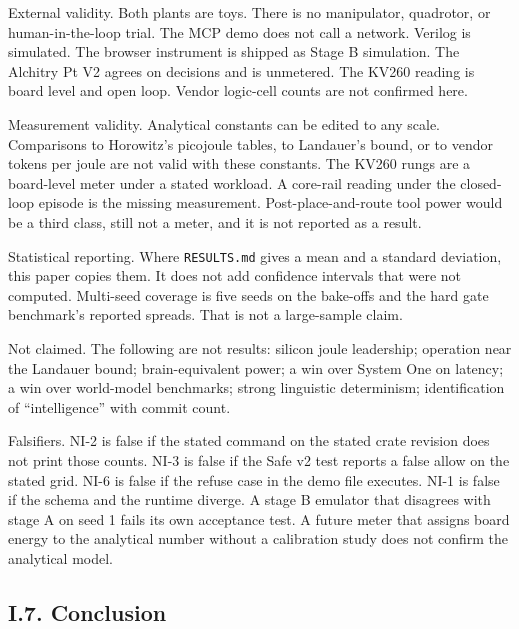 \documentclass[
  10pt,
]{article}
\begin{document}
External validity. Both plants are toys. There is no manipulator,
quadrotor, or human-in-the-loop trial. The MCP demo does not call a
network. Verilog is simulated. The browser instrument is shipped as
Stage B simulation. The Alchitry Pt V2 agrees on decisions and is
unmetered. The KV260 reading is board level and open loop. Vendor
logic-cell counts are not confirmed here.

Measurement validity. Analytical constants can be edited to any scale.
Comparisons to Horowitz's picojoule tables, to Landauer's bound, or to
vendor tokens per joule are not valid with these constants. The KV260
rungs are a board-level meter under a stated workload. A core-rail
reading under the closed-loop episode is the missing measurement.
Post-place-and-route tool power would be a third class, still not a
meter, and it is not reported as a result.

Statistical reporting. Where \texttt{RESULTS.md} gives a mean and a
standard deviation, this paper copies them. It does not add confidence
intervals that were not computed. Multi-seed coverage is five seeds on
the bake-offs and the hard gate benchmark's reported spreads. That is
not a large-sample claim.

Not claimed. The following are not results: silicon joule leadership;
operation near the Landauer bound; brain-equivalent power; a win over
System One on latency; a win over world-model benchmarks; strong
linguistic determinism; identification of ``intelligence'' with commit
count.

Falsifiers. NI-2 is false if the stated command on the stated crate
revision does not print those counts. NI-3 is false if the Safe v2 test
reports a false allow on the stated grid. NI-6 is false if the refuse
case in the demo file executes. NI-1 is false if the schema and the
runtime diverge. A stage B emulator that disagrees with stage A on seed
1 fails its own acceptance test. A future meter that assigns board
energy to the analytical number without a calibration study does not
confirm the analytical model.

\subsection{I.7. Conclusion}\label{i.7.-conclusion}
\end{document}
